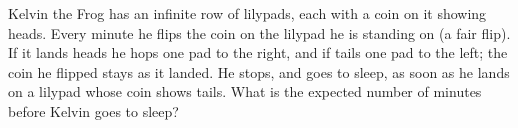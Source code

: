 Kelvin the Frog has an infinite row of lilypads, each with a coin on it showing heads. Every minute he flips the coin on the lilypad he is standing on (a fair flip). If it lands heads he hops one pad to the right, and if tails one pad to the left; the coin he flipped stays as it landed. He stops, and goes to sleep, as soon as he lands on a lilypad whose coin shows tails. What is the expected number of minutes before Kelvin goes to sleep?
